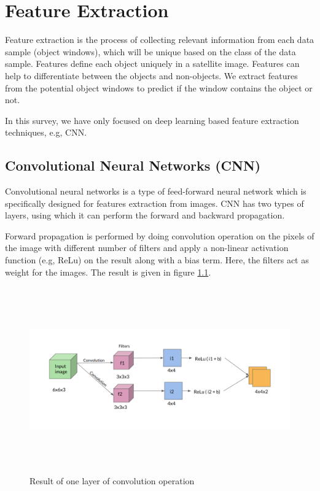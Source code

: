 \chapter{Feature Extraction}
Feature extraction is the process of collecting relevant information from each data sample (object windows), which will be unique based on the class of the data sample. Features define each object uniquely in a satellite image. Features can help to differentiate between the objects and non-objects. We extract features from the potential object windows to predict if the window contains the object or not. 
\par In this survey, we have only focused on deep learning based feature extraction techniques, e.g, CNN.


\section{Convolutional Neural Networks (CNN)}
Convolutional neural networks is a type of feed-forward neural network which is specifically designed for features extraction from images. CNN has two types of layers, using which it can perform the forward and backward propagation. 
\par Forward propagation is performed by doing convolution operation on the pixels of the image with different number of filters and apply a non-linear activation function (e.g, ReLu) on the result along with a bias term. Here, the filters act as weight for the images. The result is given in figure \ref{fig6}.

\begin{figure}[!htbp]
\centerline{\includegraphics[height=80mm,width=160mm]{img/fig6.png}}
\caption{Result of one layer of convolution operation}
\label{fig6}
\end{figure}

